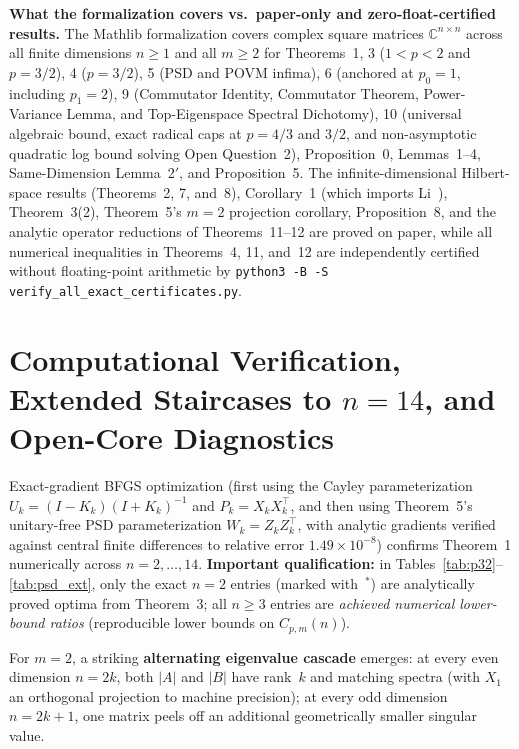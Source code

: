 \documentclass[10pt,letterpaper]{article}
\newcommand{\C}{\mathbb{C}}
\begin{document}
\textbf{What the formalization covers vs.\ paper-only and zero-float-certified results.}
The Mathlib formalization covers complex square matrices $\C^{n\times n}$ across all finite dimensions $n \ge 1$ and all $m \ge 2$ for Theorems~1, 3 ($1<p<2$ and $p=3/2$), 4 ($p=3/2$), 5 (PSD and POVM infima), 6 (anchored at $p_0 = 1$, including $p_1 = 2$), 9 (Commutator Identity, Commutator Theorem, Power-Variance Lemma, and Top-Eigenspace Spectral Dichotomy), 10 (universal algebraic bound, exact radical caps at $p = 4/3$ and $3/2$, and non-asymptotic quadratic log bound solving Open Question~2), Proposition~0, Lemmas~1--4, Same-Dimension Lemma~2$'$, and Proposition~5. The infinite-dimensional Hilbert-space results (Theorems~2, 7, and~8), Corollary~1 (which imports Li~\cite{Li2026}), Theorem~3(2), Theorem~5's $m=2$ projection corollary, Proposition~8, and the analytic operator reductions of Theorems~11--12 are proved on paper, while all numerical inequalities in Theorems~4, 11, and~12 are independently certified without floating-point arithmetic by \texttt{python3 -B -S verify\_all\_exact\_certificates.py}.

\section{Computational Verification, Extended Staircases to $n = 14$, and Open-Core Diagnostics}

Exact-gradient BFGS optimization (first using the Cayley parameterization $U_k = (I - K_k)(I + K_k)^{-1}$ and $P_k = X_k X_k^\top$, and then using Theorem~5's unitary-free PSD parameterization $W_k = Z_k Z_k^\top$, with analytic gradients verified against central finite differences to relative error $1.49\times 10^{-8}$) confirms Theorem~1 numerically across $n = 2,\dots,14$. \textbf{Important qualification:} in Tables~\ref{tab:p32}--\ref{tab:psd_ext}, only the exact $n = 2$ entries (marked with~$^*$) are analytically proved optima from Theorem~3; all $n \ge 3$ entries are \emph{achieved numerical lower-bound ratios} (reproducible lower bounds on $C_{p,m}(n)$).

For $m = 2$, a striking \textbf{alternating eigenvalue cascade} emerges: at every even dimension $n = 2k$, both $|A|$ and $|B|$ have rank~$k$ and matching spectra (with $X_1$ an orthogonal projection to machine precision); at every odd dimension $n = 2k+1$, one matrix peels off an additional geometrically smaller singular value.
\end{document}
